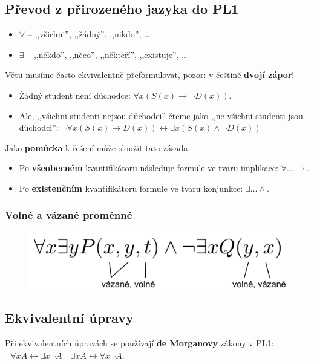 \subsection{Převod z přirozeného jazyka do PL1}
\begin{itemize}
\item $\forall$ -- ,,všichni'', ,,žádný'', ,,nikdo'', \ldots
\item $\exists$ --  ,,někdo'', ,,něco'', ,,někteří'', ,,existuje'', \ldots
\end{itemize}

\noindent Větu musíme často ekvivalentně přeformulovat, pozor: v češtině \textbf{dvojí zápor}!
\begin{itemize}
\item Žádný student není důchodce: $\forall x (S(x) \rightarrow \neg D(x))$.
\item Ale, ,,všichni studenti nejsou důchodci'' čteme jako ,,ne všichni studenti jsou důchodci'': 
$\neg \forall x (S(x) \rightarrow D(x)) \leftrightarrow \exists x (S(x) \land \neg D(x))$
\end{itemize}

\noindent Jako \textbf{pomůcka} k řešení může sloužit tato zásada:
\begin{itemize}
\item Po \textbf{všeobecném} kvantifikátoru následuje formule ve tvaru implikace: $\forall \ldots \rightarrow$.
\item Po \textbf{existenčním} kvantifikátoru formule ve tvaru konjunkce:  $\exists \ldots \land$.
\end{itemize}

\subsubsection{Volné a vázané proměnné}
\begin{figure}[H]
	\centering
	\includegraphics[width=.6\textwidth]{assets/volne_vazane}
\end{figure}

\subsection{Ekvivalentní úpravy}
Při ekvivalentních úpravách se používají \textbf{de Morganovy} zákony v PL1: $\neg \forall xA \leftrightarrow \exists x\neg A$ \qquad $\neg \exists xA \leftrightarrow \forall x\neg A$.

